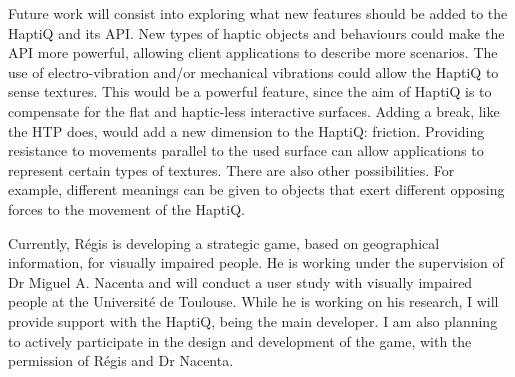 Future work will consist into exploring what new features should be added to the HaptiQ and its API. New types of haptic objects and behaviours could make the API more powerful, allowing client applications to describe more scenarios. The use of electro-vibration and/or mechanical vibrations could allow the HaptiQ to sense textures. This would be a powerful feature, since the aim of HaptiQ is to compensate for the flat and haptic-less interactive surfaces. Adding a break, like the HTP \cite{marquardt2009haptic} does, would add a new dimension to the HaptiQ: friction. Providing resistance to movements parallel to the used surface can allow applications to represent certain types of textures. There are also other possibilities. For example, different meanings can be given to objects that exert different opposing forces to the movement of the HaptiQ. 

Currently, Régis is developing a strategic game, based on geographical information, for visually impaired people. He is working under the supervision of Dr Miguel A. Nacenta and will conduct a user study with visually impaired people at the Université de Toulouse. While he is working on his research, I will provide support with the HaptiQ, being the main developer. I am also planning to actively participate in the design and development of the game, with the permission of Régis and Dr Nacenta. 